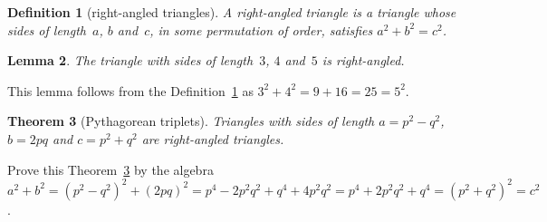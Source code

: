\documentclass[9pt]{memoir}
\begin{document}
\newtheorem{theorem}{Theorem}
\newtheorem{corollary}[theorem]{Corollary}
\newtheorem{lemma}[theorem]{Lemma}
\newtheorem{definition}[theorem]{Definition}

\begin{definition}[right-angled triangles] \label{def:tri}
A \emph{right-angled triangle} is a triangle whose sides of length~\(a\), \(b\) and~\(c\), in some permutation of order, satisfies \(a^2+b^2=c^2\).
\end{definition}

\begin{lemma} 
The triangle with sides of length~\(3\), \(4\) and~\(5\) is right-angled.
\end{lemma}

This lemma follows from the Definition~\ref{def:tri} as \(3^2+4^2=9+16=25=5^2\).

\begin{theorem}[Pythagorean triplets] \label{thm:py}
Triangles with sides of length \(a=p^2-q^2\), \(b=2pq\) and \(c=p^2+q^2\) are right-angled triangles.
\end{theorem}

Prove this Theorem~\ref{thm:py} by the algebra \(a^2+b^2 =(p^2-q^2)^2+(2pq)^2
=p^4-2p^2q^2+q^4+4p^2q^2
=p^4+2p^2q^2+q^4
=(p^2+q^2)^2 =c^2\).



\end{document}
